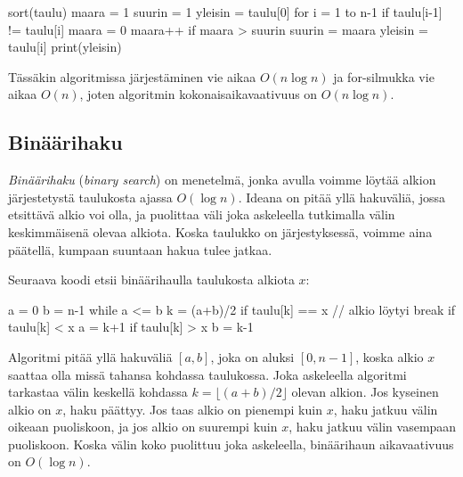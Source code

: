 \begin{code}
sort(taulu)
maara = 1
suurin = 1
yleisin = taulu[0]
for i = 1 to n-1
    if taulu[i-1] != taulu[i]
        maara = 0
    maara++
    if maara > suurin
        suurin = maara
        yleisin = taulu[i]
print(yleisin)
\end{code}

Tässäkin algoritmissa järjestäminen vie aikaa $O(n \log n)$ ja
for-silmukka vie aikaa $O(n)$, joten algoritmin
kokonaisaikavaativuus on $O(n \log n)$.

\subsection{Binäärihaku}


\emph{Binäärihaku} (\emph{binary search}) on menetelmä, jonka avulla voimme löytää alkion
järjestetystä taulukosta ajassa $O(\log n)$.
Ideana on pitää yllä hakuväliä, jossa etsittävä alkio voi olla,
ja puolittaa väli joka askeleella tutkimalla välin
keskimmäisenä olevaa alkiota.
Koska taulukko on järjestyksessä, voimme aina päätellä,
kumpaan suuntaan hakua tulee jatkaa.

Seuraava koodi etsii binäärihaulla taulukosta alkiota $x$:

\begin{code}
a = 0
b = n-1
while a <= b
    k = (a+b)/2
    if taulu[k] == x
        // alkio löytyi
        break
    if taulu[k] < x
        a = k+1
    if taulu[k] > x
        b = k-1
\end{code}

Algoritmi pitää yllä hakuväliä $[a,b]$, joka on aluksi $[0,n-1]$,
koska alkio $x$ saattaa olla missä tahansa kohdassa taulukossa.
Joka askeleella algoritmi tarkastaa välin keskellä kohdassa
$k=\lfloor (a+b)/2 \rfloor$ olevan alkion.
Jos kyseinen alkio on $x$, haku päättyy.
Jos taas alkio on pienempi kuin $x$, haku jatkuu välin
oikeaan puoliskoon,
ja jos alkio on suurempi kuin $x$, haku jatkuu välin
vasempaan puoliskoon.
Koska välin koko puolittuu joka askeleella,
binäärihaun aikavaativuus on $O(\log n)$.

